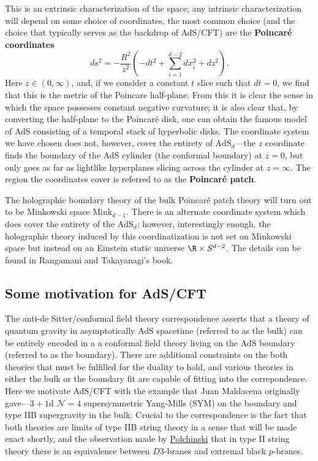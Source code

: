 \documentclass{report}
\begin{document}
This is an extrinsic characterization of the space; any intrinsic characterization 
will depend on some choice of coordinates, the most common choice (and the choice 
that typically serves as the backdrop of AdS/CFT) are the \textbf{Poincar\'e coordinates}
\begin{equation*}
	ds^2 = -\frac{R^2}{z^2}\left(-dt^2 + \sum_{i=1}^{d-2}dx_i^2 + dz^2 \right).
\end{equation*}
Here $ z\in (0,\infty) $, and, if we consider a constant $ t $ slice such that 
$ dt=0 $, we find that this is the metric of the Poincare half-plane. From this 
it is clear the sense in which the space possesses constant negative curvature; 
it is also clear that, by converting the half-plane to the Poincar\'e disk, 
one can obtain the famous model of AdS consisting of a temporal stack of 
hyperbolic disks. The coordinate system we have chosen does not, however, cover 
the entirety of $ \text{AdS}_{d} $---the $ z $ coordinate finds the boundary of 
the AdS cylinder (the conformal boundary) at $ z=0 $, but only goes as far as
lightlike hyperplanes slicing across the cylinder at $ z=\infty $. The region
the coordinates cover is referred to as the \textbf{Poincar\'e patch}. 

The holographic boundary theory of the bulk Poincar\'e patch theory will turn
out to be Minkowski space $ \text{Mink}_{d-1} $. There is an alternate
coordinate system which does cover the entirety of the $ \text{AdS}_{d} $;
however, interestingly enough, the holographic theory 
induced by this coordinatization is not set on Minkowski space but instead on an
Einstein static universe $ \R \times S^{d-2} $. The details can be found 
in Rangamani and Takayanagi's book.

\subsection{Some motivation for AdS/CFT}
The anti-de Sitter/conformal field theory correspondence asserts that a theory
of quantum gravity in asymptotically AdS spacetime (referred to as the bulk) can
be entirely encoded in a a conformal field theory living on the AdS boundary
(referred to as the boundary). There are additional constraints on the both 
theories that must be fulfilled for the duality to hold, and various theories in
either the bulk or the boundary fit are capable of fitting into the
correpondence. Here we motivate AdS/CFT with the example that Juan Maldacena
originally gave---$ 3+1 $d $ \mathcal{N}=4 $ supersymmetric Yang-Mills (SYM) on the boundary and 
type IIB supergravity in the bulk. Crucial to the correspondence is the fact 
that both theories are limits of type IIB string theory in a sense that will be
made exact shortly, and the observation made by \href{https://arxiv.org/abs/hep-th/9510017}{Polchinski}
that in type II string theory there is an equivalence between $ D3 $-branes and
extremal black $ p $-branes.
\end{document}

